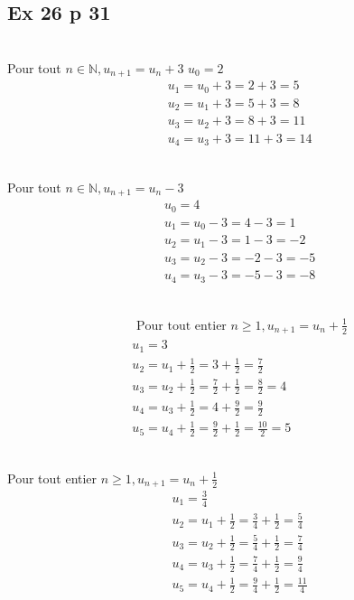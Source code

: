 \documentclass[a4paper,french]{book}
\begin{document}
\subsection*{Ex 26 p 31}
\begin{enumMet}
    \item {}\\
    Pour tout $n \in \mathbb{N}, u_{n+1}=u_{n}+3$
    $u_{0}=2$
    $$
    \begin{aligned}
    &u_{1}=u_{0}+3=2+3=5 \\
    &u_{2}=u_{1}+3=5+3=8 \\
    &u_{3}=u_{2}+3=8+3=11 \\
    &u_{4}=u_{3}+3=11+3=14
    \end{aligned}
    $$
    \item {}\\
    Pour tout $n \in \mathbb{N}, u_{n+1}=u_{n}-3$
    $$
    \begin{aligned}
    &u_{0}=4 \\
    &u_{1}=u_{0}-3=4-3=1 \\
    &u_{2}=u_{1}-3=1-3=-2 \\
    &u_{3}=u_{2}-3=-2-3=-5 \\
    &u_{4}=u_{3}-3=-5-3=-8
    \end{aligned}
    $$
    \item {}\\
    $$
    \begin{aligned}
    &\text { Pour tout entier } n \geqslant 1, u_{n+1}=u_{n}+\frac{1}{2} \\
    &u_{1}=3 \\
    &u_{2}=u_{1}+\frac{1}{2}=3+\frac{1}{2}=\frac{7}{2} \\
    &u_{3}=u_{2}+\frac{1}{2}=\frac{7}{2}+\frac{1}{2}=\frac{8}{2}=4 \\
    &u_{4}=u_{3}+\frac{1}{2}=4+\frac{9}{2}=\frac{9}{2} \\
    &u_{5}=u_{4}+\frac{1}{2}=\frac{9}{2}+\frac{1}{2}=\frac{10}{2}=5
    \end{aligned}
    $$
    \item {}\\
    Pour tout entier $n \geqslant 1, u_{n+1}=u_{n}+\frac{1}{2}$
    $$
    \begin{aligned}
    &u_{1}=\frac{3}{4} \\
    &u_{2}=u_{1}+\frac{1}{2}=\frac{3}{4}+\frac{1}{2}=\frac{5}{4} \\
    &u_{3}=u_{2}+\frac{1}{2}=\frac{5}{4}+\frac{1}{2}=\frac{7}{4} \\
    &u_{4}=u_{3}+\frac{1}{2}=\frac{7}{4}+\frac{1}{2}=\frac{9}{4} \\
    &u_{5}=u_{4}+\frac{1}{2}=\frac{9}{4}+\frac{1}{2}=\frac{11}{4}
    \end{aligned}
    $$
\end{enumMet}
\end{document}
